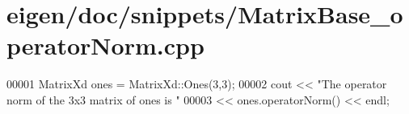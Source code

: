 \hypertarget{eigen_2doc_2snippets_2_matrix_base__operator_norm_8cpp_source}{}\section{eigen/doc/snippets/\+Matrix\+Base\+\_\+operator\+Norm.cpp}
\label{eigen_2doc_2snippets_2_matrix_base__operator_norm_8cpp_source}

\begin{DoxyCode}
00001 MatrixXd ones = MatrixXd::Ones(3,3);
00002 cout << \textcolor{stringliteral}{"The operator norm of the 3x3 matrix of ones is "}
00003      << ones.operatorNorm() << endl;
\end{DoxyCode}
